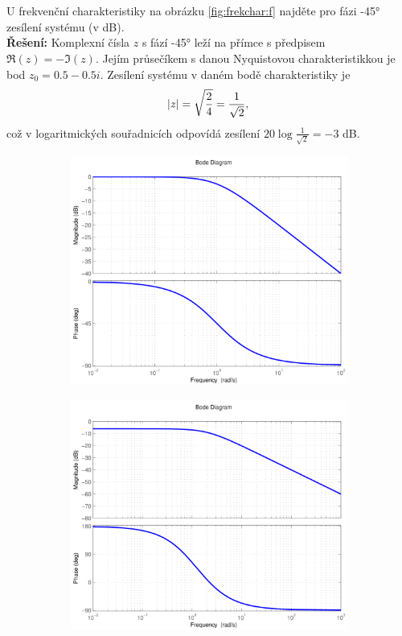 \documentclass[twoside]{article}
\begin{document}
\subsection{~}
U frekvenční charakteristiky na obrázku \ref{fig:frekchar:f} najděte pro fázi -45° zesílení systému (v dB). \\
\textbf{Řešení:} Komplexní čísla $z$ s fází -45° leží na přímce s předpisem $ \Re(z) = - \Im(z)$. Jejím průsečíkem s danou Nyquistovou charakteristikkou
je bod $z_0 = 0.5 - 0.5i$. Zesílení systému v daném bodě charakteristiky je 
\begin{equation}
	\abs{z} = \sqrt{\frac{2}{4}} = \frac{1}{\sqrt{2}},
\end{equation}
což v logaritmických souřadnicích odpovídá zesílení $20 \log{\frac{1}{\sqrt{2}}} = -3$ dB.


\begin{figure}[htbp]
    \centering %
\begin{subfigure}{0.25\textwidth}
  \includegraphics[width=\linewidth]{zadani12-a}
  \caption{}
  \label{fig:frekchar:a}
\end{subfigure}\hfil %
\begin{subfigure}{0.25\textwidth}
	\includegraphics[width=\linewidth]{zadani12-b}

\end{subfigure}
\end{figure}
\end{document}

